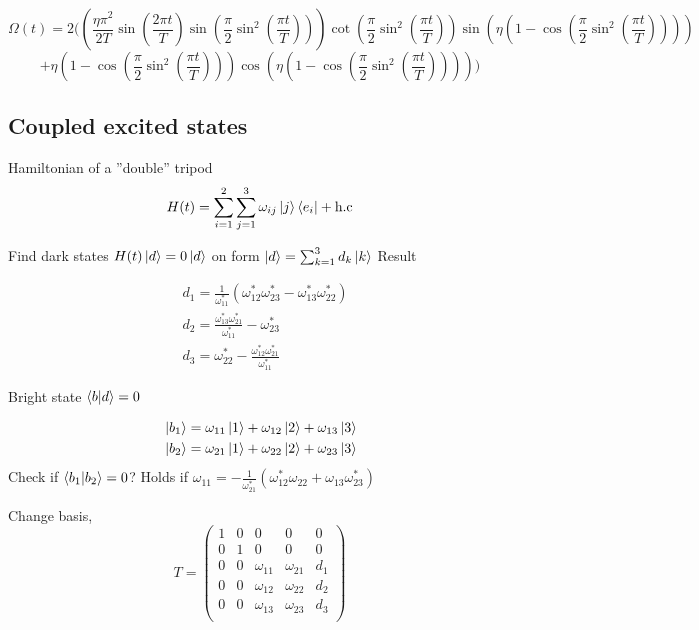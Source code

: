 \begin{equation*}
\Omega(t) = 2( (\frac{\eta\pi^2}{2T}\sin(\frac{2\pi t}{T})\sin(\frac{\pi}{2}\sin^{2}(\frac{\pi t}{T})))\cot(\frac{\pi}{2}\sin^{2}(\frac{\pi t}{T}))\sin(\eta(1 - \cos( \frac{\pi}{2}\sin^{2}(\frac{\pi t}{T}) )))
\end{equation*}
\begin{equation*}
+ \eta(1 - \cos( \frac{\pi}{2}\sin^{2}(\frac{\pi t}{T}) ))\cos(\eta(1 - \cos( \frac{\pi}{2}\sin^{2}(\frac{\pi t}{T}) ))) )
\end{equation*}



\subsection{Coupled excited states}
Hamiltonian of a ''double'' tripod
\begin{equation}
H(t) = \sum^2_{i = 1} \sum^3_{j = 1} \omega_{ij} \ket{j}\bra{e_i} + \text{h.c}
\end{equation}

Find dark states $H(t)\ket{d} = 0\ket{d} $ on form $\ket{d} = \sum_{k = 1}^3 d_k \ket{k}$
Result

\begin{equation}
\begin{aligned} &
d_1 = \frac{1}{\omega^{*}_{11}} \left(\omega^{*}_{12}\omega^{*}_{23}  - \omega^{*}_{13}\omega^{*}_{22} \right)
\\ &
d_2 = \frac{\omega^{*}_{13}\omega^{*}_{21}}{\omega^{*}_{11}} - \omega^{*}_{23}
\\ &
d_3 = \omega^{*}_{22} - \frac{\omega^{*}_{12}\omega^{*}_{21}}{\omega^{*}_{11}}
\end{aligned}
\end{equation}

Bright state $\bra{b}\ket{d} = 0$ 

\begin{equation}
\begin{aligned} &
\ket{b_1} = \omega_{11}\ket{1} + \omega_{12}\ket{2} + \omega_{13}\ket{3}
\\ &
\ket{b_2} = \omega_{21}\ket{1} + \omega_{22}\ket{2} + \omega_{23}\ket{3}
\end{aligned}
\end{equation}
Check if $\bra{b_1}\ket{b_2} = 0$? Holds if $\omega_{11} = -\frac{1}{\omega^{*}_{21}}\left(\omega^{*}_{12}\omega_{22} + \omega_{13}\omega^{*}_{23} \right)$


Change basis, 
\begin{equation}
T = \begin{pmatrix}
1 & 0 & 0 & 0 & 0 \\
0 & 1 & 0 & 0 & 0  \\
0 & 0 & \omega_{11} & \omega_{21} & d_1  \\
0 & 0 & \omega_{12} & \omega_{22} & d_2  \\
0 & 0 & \omega_{13} & \omega_{23} & d_3  \\
\end{pmatrix}
\end{equation}

